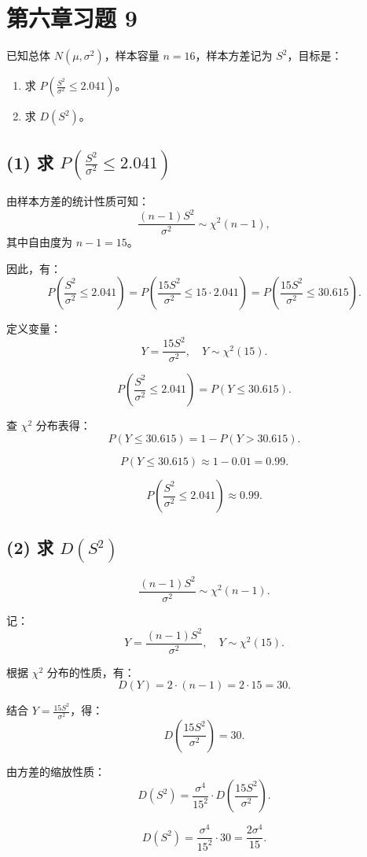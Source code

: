 \documentclass[twoside]{article}
\begin{document}
\section{第六章习题 9}

已知总体 \( N(\mu, \sigma^2) \)，样本容量 \( n = 16 \)，样本方差记为 \( S^2 \)，目标是：

\begin{enumerate}
    \item 求 \( P\left(\frac{S^2}{\sigma^2} \leq 2.041\right) \)。
    \item 求 \( D(S^2) \)。
\end{enumerate}

\begin{ans}{9}{9}

\subsection*{(1) 求 \( P\left(\frac{S^2}{\sigma^2} \leq 2.041\right) \)}

由样本方差的统计性质可知：
\[
\frac{(n-1)S^2}{\sigma^2} \sim \chi^2(n-1),
\]
其中自由度为 \( n-1 = 15 \)。

因此，有：
\[
P\left(\frac{S^2}{\sigma^2} \leq 2.041\right) = P\left(\frac{15S^2}{\sigma^2} \leq 15 \cdot 2.041\right) = P\left(\frac{15S^2}{\sigma^2} \leq 30.615\right).
\]

定义变量：
\[
Y = \frac{15S^2}{\sigma^2}, \quad Y \sim \chi^2(15).
\]

\[
P\left(\frac{S^2}{\sigma^2} \leq 2.041\right) = P\left(Y \leq 30.615\right).
\]

查 \( \chi^2 \) 分布表得：
\[
P(Y \leq 30.615) = 1 - P(Y > 30.615).
\]

\[
P(Y \leq 30.615) \approx 1 - 0.01 = 0.99.
\]

\[
P\left(\frac{S^2}{\sigma^2} \leq 2.041\right) \approx 0.99.
\]

\subsection*{(2) 求 \( D(S^2) \)}

\[
\frac{(n-1)S^2}{\sigma^2} \sim \chi^2(n-1).
\]

记：
\[
Y = \frac{(n-1)S^2}{\sigma^2}, \quad Y \sim \chi^2(15).
\]

根据 \( \chi^2 \) 分布的性质，有：
\[
D(Y) = 2 \cdot (n-1) = 2 \cdot 15 = 30.
\]

结合 \( Y = \frac{15S^2}{\sigma^2} \)，得：
\[
D\left(\frac{15S^2}{\sigma^2}\right) = 30.
\]

由方差的缩放性质：
\[
D(S^2) = \frac{\sigma^4}{15^2} \cdot D\left(\frac{15S^2}{\sigma^2}\right).
\]

\[
D(S^2) = \frac{\sigma^4}{15^2} \cdot 30 = \frac{2\sigma^4}{15}.
\]

\end{ans}
\end{document}

